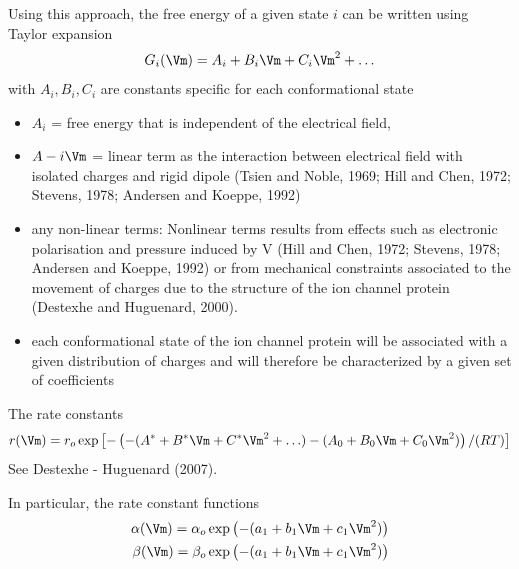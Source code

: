 Using this approach, the free energy of a given state $i$ can be written using
Taylor expansion
\begin{equation}
G_i(\Vm) = A_i + B_i \Vm + C_i \Vm^2 + \ldots
\end{equation}
with $A_i, B_i, C_i$ are constants specific for each conformational state
\begin{itemize}
  \item $A_i$ = free energy that is independent of the electrical field,

  \item $A-i \Vm$ = linear term as the interaction between electrical field with
  isolated charges and rigid dipole (Tsien and Noble, 1969; Hill
and Chen, 1972; Stevens, 1978; Andersen and Koeppe, 1992)

  \item any non-linear terms: Nonlinear terms results from effects such as
  electronic polarisation and pressure induced
by V (Hill and Chen, 1972; Stevens, 1978; Andersen and Koeppe, 1992) or from
mechanical constraints associated to the movement of charges due to the
structure of the ion channel protein (Destexhe and Huguenard, 2000).

   \item each conformational state of the ion channel protein will be associated
   with a given distribution of charges and will therefore be characterized by a
   given set of coefficients

\end{itemize}

The rate constants
\begin{equation}
r(\Vm) = r_o \exp\left[ - \left( -(A^* + B^* \Vm + C^* \Vm^2 + \ldots) - (A_0 +
B_0 \Vm + C_0 \Vm^2) \right) / (RT) \right]
\end{equation}
See Destexhe - Huguenard (2007).

In particular, the rate constant functions
\begin{equation}
\begin{split}
\alpha(\Vm) = \alpha_o \exp \left( - (a_1 + b_1 \Vm + c_1 \Vm^2) \right) \\
\beta(\Vm) = \beta_o \exp \left( - (a_1 + b_1 \Vm + c_1 \Vm^2) \right) \\
\end{split}
\end{equation}

